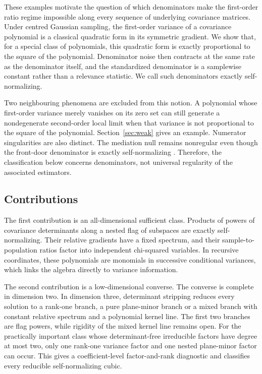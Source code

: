 \documentclass[12pt,a4paper]{article}
\theoremstyle{plain}
\theoremstyle{definition}
\begin{document}
These examples motivate the question of which denominators make the first-order ratio regime impossible along every sequence of underlying covariance matrices.
Under centred Gaussian sampling, the first-order variance of a covariance polynomial is a classical quadratic form in its symmetric gradient.
We show that, for a special class of polynomials, this quadratic form is exactly proportional to the square of the polynomial.
Denominator noise then contracts at the same rate as the denominator itself, and the standardized denominator is a samplewise constant rather than a relevance statistic.
We call such denominators exactly self-normalizing.

Two neighbouring phenomena are excluded from this notion.
A polynomial whose first-order variance merely vanishes on its zero set can still generate a nondegenerate second-order local limit when that variance is not proportional to the square of the polynomial.
Section~\ref{sec:weak} gives an example.
Numerator singularities are also distinct.
The mediation null remains nonregular even though the front-door denominator is exactly self-normalizing \citep{drtonxiao2016}.
Therefore, the classification below concerns denominators, not universal regularity of the associated estimators.

\subsection{Contributions}

The first contribution is an all-dimensional sufficient class.
Products of powers of covariance determinants along a nested flag of subspaces are exactly self-normalizing.
Their relative gradients have a fixed spectrum, and their sample-to-population ratios factor into independent chi-squared variables.
In recursive coordinates, these polynomials are monomials in successive conditional variances, which links the algebra directly to variance information.

The second contribution is a low-dimensional converse.
The converse is complete in dimension two.
In dimension three, determinant stripping reduces every solution to a rank-one branch, a pure plane-minor branch or a mixed branch with constant relative spectrum and a polynomial kernel line.
The first two branches are flag powers, while rigidity of the mixed kernel line remains open.
For the practically important class whose determinant-free irreducible factors have degree at most two, only one rank-one variance factor and one nested plane-minor factor can occur.
This gives a coefficient-level factor-and-rank diagnostic and classifies every reducible self-normalizing cubic.
\end{document}
